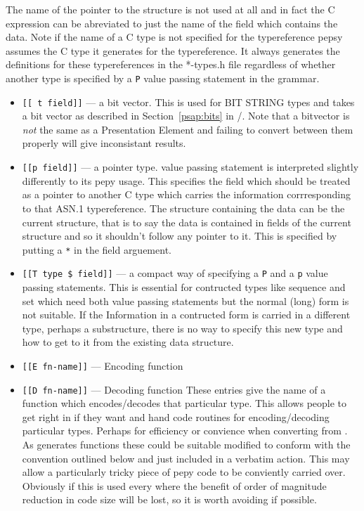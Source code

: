 The name of the pointer to the structure is not used at all and
in fact the C expression can be abreviated to just the name of the field which
contains the data.
Note if the name of a C type is not specified for the typereference
pepsy assumes the C type it generates for the typereference.
It always generates the definitions for these typereferences in the *-types.h
file regardless of whether another type is specified by a \verb"P" value passing
statement in the grammar.

\begin{itemize}

\item \verb"[[ t field]]" --- a bit vector.
This is used for BIT STRING types and takes a bit vector as described
in Section~\ref{psap:bits} in \volone/.
Note that a bitvector is {\em not} the same as a Presentation Element and
failing to convert between them properly will give inconsistant results.

\item \verb"[[p field]]" --- a pointer type.
value passing statement is interpreted slightly differently
to its pepy usage.
This specifies the field which should be treated as a pointer to another
C type which carries the information corrresponding
to that ASN.1 typereference.
The structure containing the data can be the current structure,
that is to say the data is contained in fields of the current structure and
so it shouldn't follow any pointer to it.
This is specified by putting a \verb"*" in the field arguement.

\item \verb"[[T type $ field]]" --- a compact way of specifying
a \verb"P" and a \verb"p" value passing statements.
This is essential for contructed types like sequence and set
which need both value passing statements but the normal (long) form is
not suitable.
If the Information in a contructed form is carried in a different type,
perhaps a substructure, there is no way to specify this new type and
how to get to it from the existing data structure.

\item \verb"[[E fn-name]]" --- Encoding function
\item \verb"[[D fn-name]]" --- Decoding function
These entries give the name of a function which encodes/decodes that particular
type.
This allows people to get right in if they want and hand code routines for
encoding/decoding particular types. Perhaps for efficiency or convience when
converting from .
As  generates functions these could be suitable modified to conform
with the convention outlined below and just included in a verbatim action.
This may allow a particularly tricky piece of pepy code to be conviently
carried over.
Obviously if this is used every where the  benefit of order of
magnitude reduction in code size will be lost, so it is worth avoiding if
possible.

\end{itemize}

